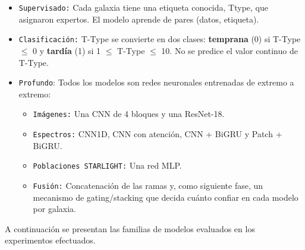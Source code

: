 \documentclass[12pt]{article}
\begin{document}
\begin{itemize}
    \item \texttt{Supervisado:} Cada galaxia tiene una etiqueta conocida, Ttype, que asignaron expertos. El modelo aprende de pares (datos, etiqueta).
    \item \texttt{Clasificación:} T-Type se convierte en dos clases: \textbf{temprana} (0) si T-Type $\leq$  0 y \textbf{tardía} (1) si 1 $\leq$  T-Type $\leq$  10. No se predice el valor continuo de T-Type.
    \item \texttt{Profundo}: Todos los modelos son redes neuronales entrenadas de extremo a extremo:

        \begin{itemize}
            \item \texttt{Imágenes:} Una CNN de 4 bloques y una ResNet-18.
            \item \texttt{Espectros:} CNN1D, CNN con atención, CNN + BiGRU y Patch + BiGRU.
            \item \texttt{Poblaciones STARLIGHT:} Una red MLP.
            \item \texttt{Fusión:} Concatenación de las ramas y, como siguiente fase, un mecanismo de gating/stacking que decida cuánto confiar en cada modelo por galaxia.
        \end{itemize}

\end{itemize}

A continuación se presentan las familias de modelos evaluados en los experimentos efectuados.

\small
\end{document}
